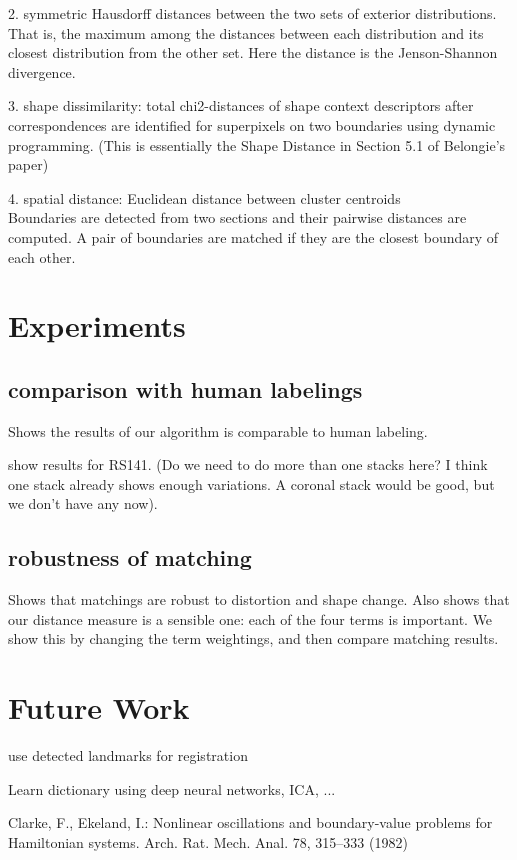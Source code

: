 \documentclass{llncs}
\begin{document}
2. symmetric Hausdorff distances between the two sets of exterior distributions. That is, the maximum among the distances between each distribution and its closest distribution from the other set. Here the distance is the Jenson-Shannon divergence.

3. shape dissimilarity: total chi2-distances of shape context descriptors after correspondences are identified for superpixels on two boundaries using dynamic programming. (This is essentially the Shape Distance in Section 5.1 of Belongie's paper)

4. spatial distance: Euclidean distance between cluster centroids
\\

Boundaries are detected from two sections and their pairwise distances are computed. A pair of boundaries are matched if they are the closest boundary of each other.

\section{Experiments}

\subsection{comparison with human labelings}

Shows the results of our algorithm is comparable to human labeling.

show results for RS141. (Do we need to do more than one stacks here? I think one stack already shows enough variations. A coronal stack would be good, but we don't have any now).

\subsection{robustness of matching}

Shows that matchings are robust to distortion and shape change.
Also shows that our distance measure is a sensible one: each of the four terms is important. We show this by changing the term weightings, and then compare matching results.

\section{Future Work}

use detected landmarks for registration

Learn dictionary using deep neural networks, ICA, ...



%
%
\begin{thebibliography}{5}
%
Clarke, F., Ekeland, I.:
Nonlinear oscillations and
boundary-value problems for Hamiltonian systems.
Arch. Rat. Mech. Anal. 78, 315--333 (1982)

\end{thebibliography}
\end{document}
